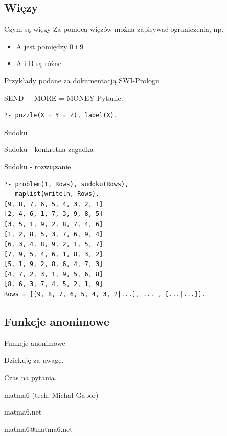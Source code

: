 \documentclass[blue]{beamer}
\begin{document}
\subsection{Więzy}
\begin{frame}{Czym są więzy}
Za pomocą więzów można zapisywać ograniczenia, np.
\begin{itemize}
\item A jest pomiędzy 0 i 9
\item A i B są różne
\end{itemize}

Przykłady podane za dokumentacją SWI-Prologu
\end{frame}
\begin{frame}[fragile]{SEND + MORE = MONEY}
Pytanie:
\begin{lstlisting}
?- puzzle(X + Y = Z), label(X).
\end{lstlisting}

\end{frame}
\begin{frame}{Sudoku}

\end{frame}
\begin{frame}{Sudoku - konkretna zagadka}

\end{frame}
\begin{frame}[fragile]{Sudoku - rozwiązanie}
\begin{lstlisting}
?- problem(1, Rows), sudoku(Rows),
   maplist(writeln, Rows).
[9, 8, 7, 6, 5, 4, 3, 2, 1]
[2, 4, 6, 1, 7, 3, 9, 8, 5]
[3, 5, 1, 9, 2, 8, 7, 4, 6]
[1, 2, 8, 5, 3, 7, 6, 9, 4]
[6, 3, 4, 8, 9, 2, 1, 5, 7]
[7, 9, 5, 4, 6, 1, 8, 3, 2]
[5, 1, 9, 2, 8, 6, 4, 7, 3]
[4, 7, 2, 3, 1, 9, 5, 6, 8]
[8, 6, 3, 7, 4, 5, 2, 1, 9]
Rows = [[9, 8, 7, 6, 5, 4, 3, 2|...], ... , [...|...]].
\end{lstlisting}
\end{frame}
\subsection{Funkcje anonimowe}
\begin{frame}{Funkcje anonimowe}

\end{frame}
\begin{frame}
\begin{center}
\begin{Huge}
Dziękuję za uwagę.

Czas na pytania.

matma6 (tech. Michał Gabor)

matma6.net

matma6@matma6.net

\end{Huge}
\end{center}
\end{frame}
\end{document}
